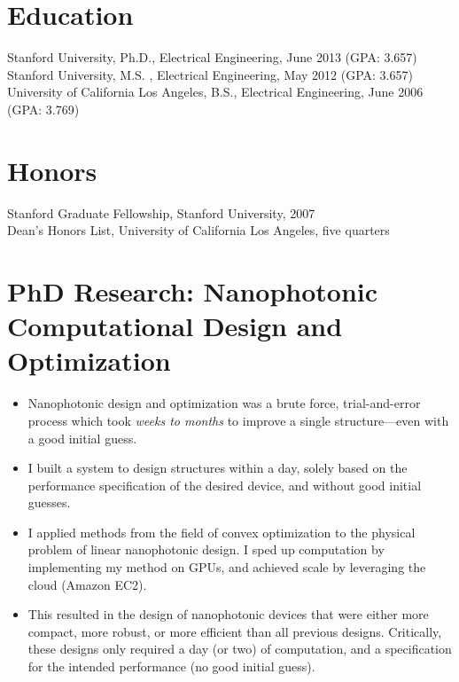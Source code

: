 \documentclass{res}
\begin{document}
 

\address{\texttt{jesselu@stanford.edu} \\ 66 Newell Rd. Apt. O \\ East Palo Alto, CA \\ (408) 568-9356}
                                  
\begin{resume}

\section{Education}          
    Stanford University, Ph.D., Electrical Engineering, June 2013 (GPA: 3.657)\\
    Stanford University, M.S. , Electrical Engineering, May 2012 (GPA: 3.657)\\
    University of California Los Angeles, B.S., Electrical Engineering, June 2006 (GPA: 3.769)

\section{Honors}
    Stanford Graduate Fellowship, Stanford University, 2007 \\
    Dean's Honors List, University of California Los Angeles, five quarters

\section{PhD Research: Nanophotonic Computational Design and Optimization}
\begin{itemize}
\item Nanophotonic design and optimization was 
    a brute force, trial-and-error process
    which took \emph{weeks to months} to improve a single structure---even with 
    a good initial guess.
\item I built a system to design structures within a day,
    solely based on the performance specification of the desired device,
    and without good initial guesses.
\item I applied methods from the field of convex optimization 
    to the physical problem of linear nanophotonic design. 
    I sped up computation by implementing my method on GPUs,
    and achieved scale by leveraging the cloud (Amazon EC2).
\item This resulted in the design 
    of nanophotonic devices that were either
    more compact, more robust, or more efficient 
    than all previous designs.
    Critically, these designs only required a day (or two) of computation,
    and a specification for the intended performance (no good initial guess).
    \end{itemize}


\end{resume}
\end{document}

